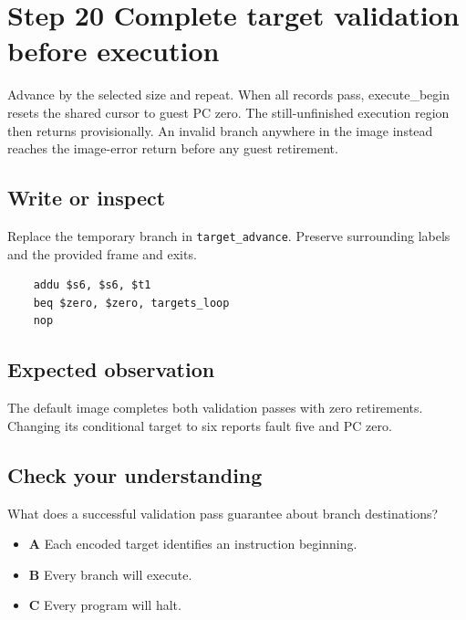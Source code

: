 \section{Step 20 Complete target validation before execution}\label{vm-s20}

Advance by the selected size and repeat. When all records pass, execute\_begin resets the shared cursor to guest PC zero. The still-unfinished execution region then returns provisionally. An invalid branch anywhere in the image instead reaches the image-error return before any guest retirement.

\subsection{Write or inspect}
Replace the temporary branch in \texttt{target\_advance}. Preserve surrounding labels and the provided frame and exits.

\begin{verbatim}
    addu $s6, $s6, $t1
    beq $zero, $zero, targets_loop
    nop
\end{verbatim}
\subsection{Expected observation}
The default image completes both validation passes with zero retirements. Changing its conditional target to six reports fault five and PC zero.

\subsection{Check your understanding}
What does a successful validation pass guarantee about branch destinations?

\begin{itemize}
  \item \textbf{A} Each encoded target identifies an instruction beginning.
  \item \textbf{B} Every branch will execute.
  \item \textbf{C} Every program will halt.
\end{itemize}
